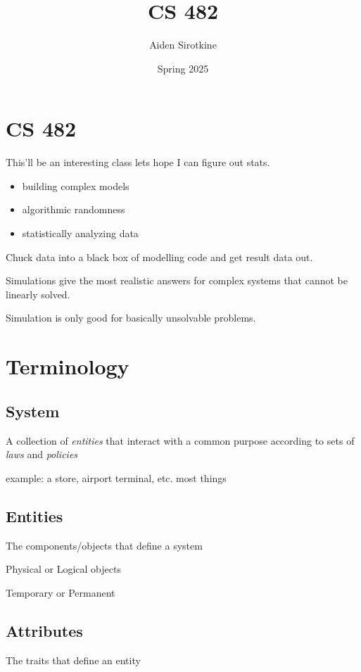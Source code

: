 \documentclass[fleqn]{report}
\date{Spring 2025}
\title{CS 482}
\author{Aiden Sirotkine}
\newcommand{\hp}{\hspace{1cm}}
\begin{document}
\graphicspath{ {../Images/} }
\pagestyle{fancy}
\maketitle
\tableofcontents
\clearpage

\chapter{CS 482}
This'll be an interesting class lets hope I can figure out stats.

\begin{itemize}
    \item 
    building complex models 
    \item 
    algorithmic randomness 
    \item 
    statistically analyzing data
\end{itemize}

Chuck data into a black box of modelling code and get result data out. 

Simulations give the most realistic answers for complex systems that cannot be 
linearly solved. 

Simulation is only good for basically unsolvable problems. 

\chapter{Terminology}

\section{System}
A collection of \textit{entities} that interact with a common 
purpose according to sets of \textit{laws} and \textit{policies}

example: a store, airport terminal, etc. \hp most things 

\section{Entities}
The components/objects that define a system

Physical or Logical objects 

Temporary or Permanent 

\section{Attributes}
The traits that define an entity 
\end{document}
